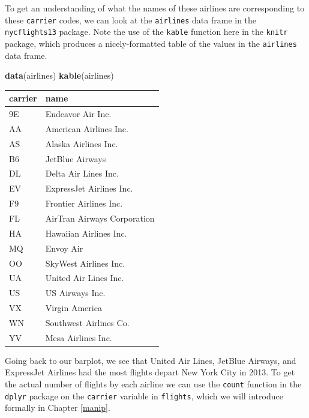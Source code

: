 \documentclass[]{tufte-book}
\newenvironment{Shaded}{\begin{snugshade}}{\end{snugshade}}
\newcommand{\KeywordTok}[1]{\textcolor[rgb]{0.13,0.29,0.53}{\textbf{{#1}}}}
\newcommand{\StringTok}[1]{\textcolor[rgb]{0.31,0.60,0.02}{{#1}}}
\newcommand{\NormalTok}[1]{{#1}}
\theoremstyle{definition}
\theoremstyle{definition}
\theoremstyle{remark}
\begin{document}
To get an understanding of what the names of these airlines are
corresponding to these \texttt{carrier} codes, we can look at the
\texttt{airlines} data frame in the \texttt{nycflights13} package. Note
the use of the \texttt{kable} function here in the \texttt{knitr}
package, which produces a nicely-formatted table of the values in the
\texttt{airlines} data frame.

\begin{Shaded}
\begin{Highlighting}[]
\KeywordTok{data}\NormalTok{(airlines)}
\KeywordTok{kable}\NormalTok{(airlines)}
\end{Highlighting}
\end{Shaded}

\begin{tabular}{l|l}
\hline
carrier & name\\
\hline
9E & Endeavor Air Inc.\\
\hline
AA & American Airlines Inc.\\
\hline
AS & Alaska Airlines Inc.\\
\hline
B6 & JetBlue Airways\\
\hline
DL & Delta Air Lines Inc.\\
\hline
EV & ExpressJet Airlines Inc.\\
\hline
F9 & Frontier Airlines Inc.\\
\hline
FL & AirTran Airways Corporation\\
\hline
HA & Hawaiian Airlines Inc.\\
\hline
MQ & Envoy Air\\
\hline
OO & SkyWest Airlines Inc.\\
\hline
UA & United Air Lines Inc.\\
\hline
US & US Airways Inc.\\
\hline
VX & Virgin America\\
\hline
WN & Southwest Airlines Co.\\
\hline
YV & Mesa Airlines Inc.\\
\hline
\end{tabular}

Going back to our barplot, we see that United Air Lines, JetBlue
Airways, and ExpressJet Airlines had the most flights depart New York
City in 2013. To get the actual number of flights by each airline we can
use the \texttt{count} function in the \texttt{dplyr} package on the
\texttt{carrier} variable in \texttt{flights}, which we will introduce
formally in Chapter \ref{manip}.

\begin{Shaded}
\end{Shaded}
\end{document}
